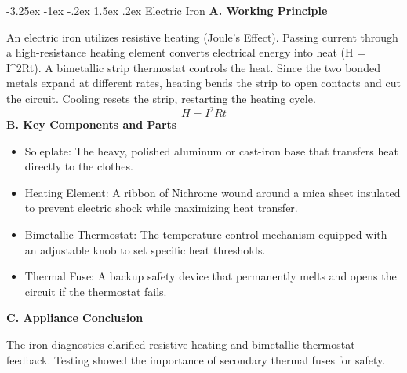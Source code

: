 \documentclass[11pt,a4paper]{report}
\makeatletter
\renewcommand{\section}{\@startsection{section}{1}{\z@}%
  {-3.25ex \@plus -1ex \@minus -.2ex}%
  {1.5ex \@plus.2ex}%
  {\normalfont\Large\bfseries\color{primaryColor}}}
\makeatother
\begin{document}
\section{Electric Iron}
\noindent\textbf{A. Working Principle}\par\medskip
An electric iron utilizes resistive heating (Joule's Effect). Passing current through a high-resistance heating element converts electrical energy into heat (H = I\textasciicircum{}2Rt). A bimetallic strip thermostat controls the heat. Since the two bonded metals expand at different rates, heating bends the strip to open contacts and cut the circuit. Cooling resets the strip, restarting the heating cycle.
\begin{equation}H = I^2 R t\end{equation}
\noindent\textbf{B. Key Components and Parts}\par\medskip
\begin{itemize}
  \item Soleplate: The heavy, polished aluminum or cast-iron base that transfers heat directly to the clothes.
  \item Heating Element: A ribbon of Nichrome wound around a mica sheet insulated to prevent electric shock while maximizing heat transfer.
  \item Bimetallic Thermostat: The temperature control mechanism equipped with an adjustable knob to set specific heat thresholds.
  \item Thermal Fuse: A backup safety device that permanently melts and opens the circuit if the thermostat fails.
\end{itemize}
\noindent\textbf{C. Appliance Conclusion}\par\medskip
The iron diagnostics clarified resistive heating and bimetallic thermostat feedback. Testing showed the importance of secondary thermal fuses for safety.
\end{document}
